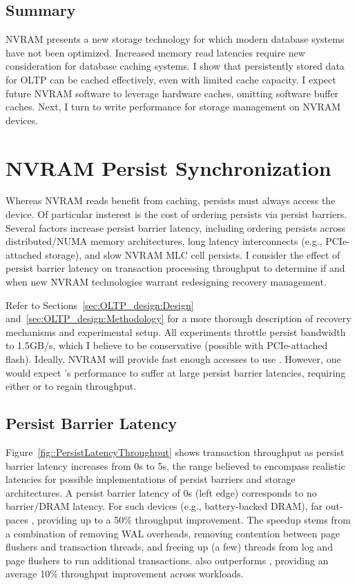 \subsection{Summary}
\label{sec:OLTP_eval:Reads:Summary}
NVRAM presents a new storage technology for which modern database systems have not been optimized.
Increased memory read latencies require new consideration for database caching systems.
I show that persistently stored data for OLTP can be cached effectively, even with limited cache capacity.
I expect future NVRAM software to leverage hardware caches, omitting software buffer caches.
Next, I turn to write performance for storage management on NVRAM devices.

\section{NVRAM Persist Synchronization}
\label{sec:OLTP_eval:Persists}

Whereas NVRAM reads benefit from caching, persists must always access the device.
Of particular insterest is the cost of ordering persists via persist barriers.
Several factors increase persist barrier latency, including ordering persists across distributed/NUMA memory architectures, long latency interconnects (e.g., PCIe-attached storage), and slow NVRAM MLC cell persists.
I consider the effect of persist barrier latency on transaction processing throughput to determine if and when new NVRAM technologies warrant redesigning recovery management.

Refer to Sections~\ref{sec:OLTP_design:Design} and~\ref{sec:OLTP_design:Methodology} for a more thorough description of recovery mechanisms and experimental setup.
All experiments throttle persist bandwidth to 1.5GB/s, which I believe to be conservative (possible with PCIe-attached flash).
Ideally, NVRAM will provide fast enough accesses to use \InPlace.
However, one would expect \InPlace's performance to suffer at large persist barrier latencies, requiring either \NVDisk or \GroupCommit to regain throughput.

\subsection{Persist Barrier Latency}
\label{sec:OLTP_eval:Persists:Performance}



Figure~\ref{fig::PersistLatencyThroughput} shows transaction throughput as persist barrier latency increases from 0\textmu s to 5\textmu s, the range believed to encompass realistic latencies for possible implementations of persist barriers and storage architectures.
A persist barrier latency of 0\textmu s (left edge) corresponds to no barrier/DRAM latency.
For such devices (e.g., battery-backed DRAM), \InPlace far out-paces \NVDisk, providing up to a 50\% throughput improvement.
The speedup stems from a combination of removing WAL overheads, removing contention between page flushers and transaction threads, and freeing up (a few) threads from log and page flushers to run additional transactions.
\InPlace also outperforms \GroupCommit, providing an average 10\% throughput improvement across workloads.

